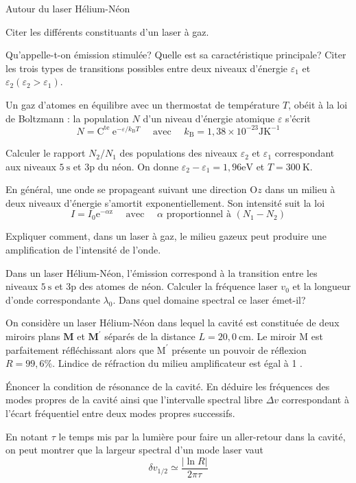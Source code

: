 \begin{exo}[PC][1][colle]{Autour du laser Hélium-Néon}
  \begin{quest}
    \item Citer les différents constituants d'un laser à gaz.
    \item Qu'appelle-t-on émission stimulée? Quelle est sa caractéristique principale? Citer les trois types de transitions possibles entre deux niveaux d'énergie $\varepsilon_1$ et $\varepsilon_2\left(\varepsilon_2>\varepsilon_1\right)$.
    \item Un gaz d'atomes en équilibre avec un thermostat de température $T$, obéit à la loi de Boltzmann : la population $N$ d'un niveau d'énergie atomique $\varepsilon$ s'écrit
    $$
N=\mathrm{C}^{\text {te }} \mathrm{e}^{-\varepsilon / k_{\mathrm{B}} T} \quad \text { avec } \quad k_{\mathrm{B}}=1,38 \times 10^{-23} \mathrm{JK}^{-1}
$$

Calculer le rapport $N_2 / N_1$ des populations des niveaux $\varepsilon_2$ et $\varepsilon_1$ correspondant aux niveaux $5 \mathrm{~s}$ et $3 \mathrm{p}$ du néon. On donne $\varepsilon_2-\varepsilon_1=1,96 \mathrm{eV}$ et $T=300 \mathrm{~K}$.
\item En général, une onde se propageant suivant une direction $\mathrm{O} z$ dans un milieu à deux niveaux d'énergie s'amortit exponentiellement. Son intensité suit la loi
$$
I=I_0 \mathrm{e}^{-\alpha \mathrm{z}} \quad \text { avec } \quad \alpha \text { proportionnel à }\left(N_1-N_2\right)
$$

Expliquer comment, dans un laser à gaz, le milieu gazeux peut produire une amplification de l'intensité de l'onde.
\item Dans un laser Hélium-Néon, l'émission correspond à la transition entre les niveaux $5 \mathrm{~s}$ et $3 \mathrm{p}$ des atomes de néon. Calculer la fréquence laser $v_0$ et la longueur d'onde correspondante $\lambda_0$. Dans quel domaine spectral ce laser émet-il?

On considère un laser Hélium-Néon dans lequel la cavité est constituée de deux miroirs plans $\mathbf{M}$ et $\mathbf{M}^{\prime}$ séparés de la distance $L=20,0 \mathrm{~cm}$. Le miroir $\mathrm{M}$ est parfaitement réfléchissant alors que $\mathrm{M}^{\prime}$ présente un pouvoir de réflexion $R=99,6 \%$. Lindice de réfraction du milieu amplificateur est égal à 1 .
\item Énoncer la condition de résonance de la cavité. En déduire les fréquences des modes propres de la cavité ainsi que l'intervalle spectral libre $\Delta v$ correspondant à l'écart fréquentiel entre deux modes propres successifs.
\item En notant $\tau$ le temps mis par la lumière pour faire un aller-retour dans la cavité, on peut montrer que la largeur spectral d'un mode laser vaut
$$
\delta v_{1 / 2} \simeq \frac{|\ln R|}{2 \pi \tau}
$$


\end{quest}
\end{exo}
